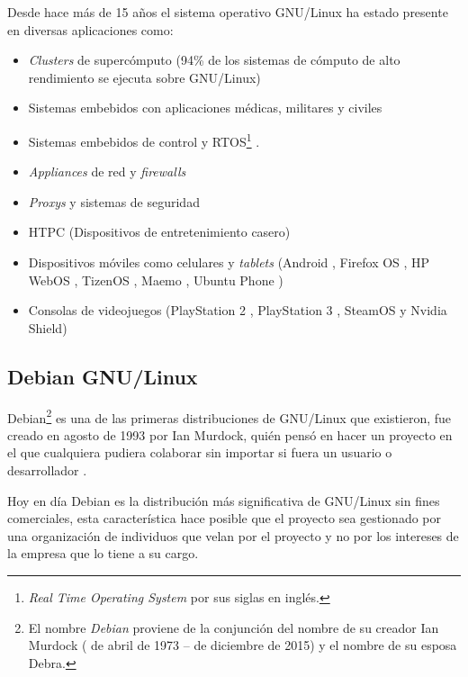 Desde hace m\'{a}s de 15 a\~{n}os el sistema operativo \textsc{GNU}/Linux ha estado presente en diversas aplicaciones como:

\begin{itemize}
  \item \textit{Clusters} de superc\'{o}mputo (94\% de los sistemas de c\'{o}mputo de alto rendimiento se ejecuta sobre GNU/Linux) \cite{_tic_????}\cite{_94_????}
  \item Sistemas embebidos con aplicaciones m\'{e}dicas, militares y civiles \cite{_elinux.org_????}\cite{_rtos_????}
  \item Sistemas embebidos de control y \textsc{RTOS}\footnote{\textit{Real Time Operating System} por sus siglas en ingl\'{e}s.} \cite{_uclinux_????}\cite{_rtos_????}.
  \item \textit{Appliances} de red y \textit{firewalls} \cite{_router/bridge_????}\cite{_endian_????}
  \item \textit{Proxys} y sistemas de seguridad \cite{_f5_????}\cite{_junos_????}\cite{_infoblox_????}
  \item \textsc{HTPC} (Dispositivos de entretenimiento casero) \cite{_openelec_????}
  \item Dispositivos m\'{o}viles como celulares y \textit{tablets} (Android \cite{_android_????}, Firefox OS \cite{_firefox_????}, HP WebOS \cite{_hp_????}, TizenOS \cite{_tizen_????}, Maemo \cite{_maemo.org_????}, Ubuntu Phone \cite{_ubuntu_????})
  \item Consolas de videojuegos (PlayStation 2 \cite{_ps2_????}, PlayStation 3 \cite{_open_????}, SteamOS y Nvidia Shield)
\end{itemize}

  \subsection {Debian GNU/Linux}

Debian\footnote{El nombre \textit{Debian} proviene de la conjunci\'{o}n del nombre de su creador Ian Murdock ( de abril de 1973 –  de diciembre de 2015) y el nombre de su esposa Debra.} es una de las primeras distribuciones de GNU/Linux que existieron, fue creado en agosto de 1993 por Ian Murdock, qui\'{e}n pens\'{o} en hacer un proyecto en el que cualquiera pudiera colaborar sin importar si fuera un usuario o desarrollador \cite{_debian_????}.

Hoy en d\'{i}a Debian es la distribuci\'{o}n m\'{a}s significativa de GNU/Linux sin fines comerciales, esta caracter\'{i}stica hace posible que el proyecto sea gestionado por una organizaci\'{o}n de individuos que velan por el proyecto y no por los intereses de la empresa que lo tiene a su cargo.

